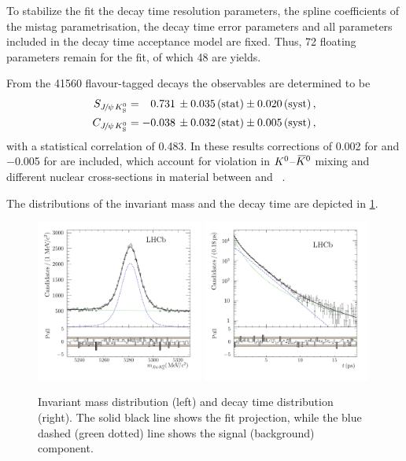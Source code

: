 To stabilize the fit the decay time resolution parameters, the spline
coefficients of the mistag parametrisation, the decay time error parameters
and all parameters included in the decay time acceptance model are fixed.
Thus, \num{72} floating parameters remain for the fit, of which \num{48} are
yields.

From the \num{41560} flavour-tagged \BdToJPsiKS decays the \CP observables are determined to be
\begin{align*}
  S_{{{J\mskip -3mu/\mskip -2mu\psi\mskip 2mu}}{{K}^0_{\mathrm{ \scriptscriptstyle S}}}} &=  \phantom{-}0.731 \, \pm 0.035 \, \text{(stat)} \pm 0.020 \, \text{(syst)}\,, \\
  C_{{{J\mskip -3mu/\mskip -2mu\psi\mskip 2mu}}{{K}^0_{\mathrm{ \scriptscriptstyle S}}}} &=  			- 0.038 \, \pm 0.032 \, \text{(stat)} \pm 0.005 \, \text{(syst)}\,,
\end{align*}
with a statistical correlation of \num{0.483}. In these results corrections of
\num{+0.002} for \SJpsiKS and \num{-0.005} for \CJpsiKS are included, which
account for \CP violation in ${{K}^0}$--${{\kern 0.2em\overline{\kern -0.2em K}{}}{}^0}$ mixing and different nuclear
cross-sections in material between \Kz and
\Kzb~\cite{Fetscher:1996fa,*Ko:2010mk}.

The distributions of the invariant mass and the decay time are depicted in
\cref{fig:bd2jpsiks:nominalfit:mass_and_time}.

\begin{figure}[htb]
\includegraphics[width=0.49\textwidth]{06-Bd2JpsiKS/tikz/pdf/MassPulls_summed.pdf}
\includegraphics[width=0.49\textwidth]{06-Bd2JpsiKS/tikz/pdf/obsTime_summed_pull_logy.pdf}
\caption{
Invariant mass distribution (left) and decay time distribution (right). The solid black line
shows the fit projection, while the blue dashed (green dotted) line shows the
signal (background) component.}
\label{fig:bd2jpsiks:nominalfit:mass_and_time}
\end{figure}
